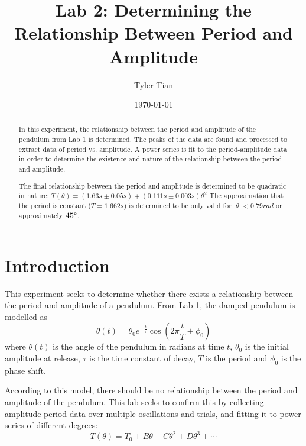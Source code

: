 \documentclass[aps,twocolumn,secnumarabic,nobalancelastpage,amsmath,amssymb,nofootinbib,floatfix,letterpaper]{revtex4}
\begin{document}
\title{Lab 2: Determining the Relationship Between Period and Amplitude}
\author{Tyler Tian}
\noaffiliation
\date{\today}


\begin{abstract}
In this experiment, the relationship between the period and amplitude of the pendulum from Lab 1 is determined. The
peaks of the data are found and processed to extract data of period vs. amplitude. A power series is fit to the 
period-amplitude data in order to determine the existence and nature of the relationship between the period and
amplitude.

The final relationship between the period and amplitude is determined to be quadratic in nature:
$T(\theta) = (1.63\si{s} \pm 0.05\si{s}) + (0.111\si{s} \pm 0.003\si{s})\theta^2$ The approximation that the period
is constant ($T = 1.662\si{s}$) is determined to be only valid for $|\theta| < 0.79\si{rad}$ or approximately
$45\degree$.
\end{abstract}

\maketitle


\section{Introduction}

This experiment seeks to determine whether there exists a relationship between the period and amplitude of a pendulum.
From Lab 1, the damped pendulum is modelled as
\begin{equation}
    \theta(t) = \theta_0 e^{-\frac{t}{\tau}}\cos\left(2\pi\frac{t}{T} + \phi_0\right)
    \label{eqn:model}
\end{equation}
where $\theta(t)$ is the angle of the pendulum in radians at time $t$, $\theta_0$ is the initial amplitude at release,
$\tau$ is the time constant of decay, $T$ is the period and $\phi_0$ is the phase shift.

According to this model, there should be no relationship between the period and amplitude of the pendulum. This lab
seeks to confirm this by collecting amplitude-period data over multiple oscillations and trials, and fitting it to power
series of different degrees:
\begin{equation}
    T(\theta) = T_0 + B\theta + C\theta^2 + D\theta^3 + \cdots
    \label{eqn:power_series}
\end{equation}
\end{document}
